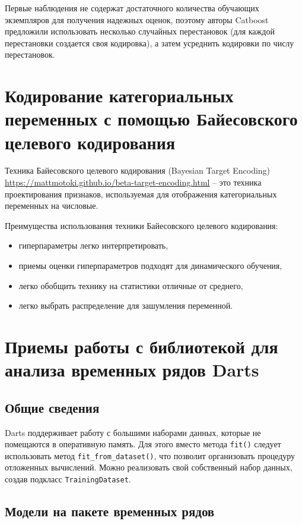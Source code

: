 \documentclass[%
	11pt,
	a4paper,
	utf8,
		]{article}
\begin{document}
Первые наблюдения не содержат достаточного количества обучающих экземпляров для получения надежных оценок, поэтому авторы Catboost предложили использовать несколько случайных перестановок (для каждой перестановки создается своя кодировка), а затем усреднить кодировки по числу перестановок.

\section{Кодирование категориальных переменных с помощью Байесовского целевого кодирования}

Техника Байесовского целевого кодирования (Bayesian Target Encoding) \url{https://mattmotoki.github.io/beta-target-encoding.html} -- это техника проектирования признаков, используемая для отображения категориальных переменных на числовые.

Преимущества использования техники Байесовского целевого кодирования:
\begin{itemize}
	\item  гиперпараметры легко интерпретировать,
	
	\item приемы оценки гиперпараметров подходят для динамического обучения,
	
	\item легко обобщить технику на статистики отличные от среднего,
	
	\item легко выбрать распределение для зашумления переменной.
\end{itemize}

\section{Приемы работы с библиотекой для анализа временных рядов Darts}

\subsection{Общие сведения}

Darts поддерживает работу с большими наборами данных, которые не помещаются в оперативную память. Для этого вместо метода \texttt{fit()} следует использовать метод \texttt{fit\_from\_dataset()}, что позволит организовать процедуру отложенных вычислений. Можно реализовать свой собственный набор данных, создав подкласс \texttt{TrainingDataset}.

\subsection{Модели на пакете временных рядов}
\end{document}
